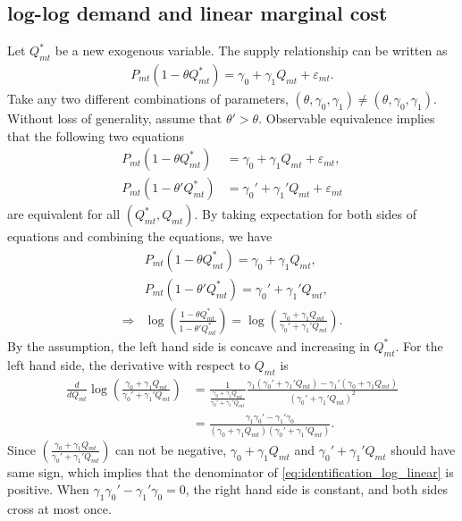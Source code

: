 \documentclass[11pt, a4paper]{article}
\numberwithin{figure}{section}
\theoremstyle{definition}
\newcommand{\0}{\mathbf{0}}
\begin{document}
\subsection{ log-log demand and linear marginal cost}
Let $Q^*_{mt}$ be a new exogenous variable. The supply relationship can be written as 
\begin{align*}
    P_{mt}(1- \theta Q^*_{mt}) = \gamma_0 + \gamma_1 Q_{mt} + \varepsilon_{mt}.
\end{align*}
Take any two different combinations of parameters, $(\theta, \gamma_0, \gamma_1) \ne (\theta, \gamma_0, \gamma_1)$. Without loss of generality, assume that $\theta' > \theta$. Observable equivalence implies that the following two equations
\begin{align*}
    P_{mt}(1- \theta Q^*_{mt}) &= \gamma_0 + \gamma_1 Q_{mt} + \varepsilon_{mt},\\
    P_{mt}(1- \theta' Q^*_{mt}) &= \gamma_0' + \gamma_1' Q_{mt} + \varepsilon_{mt}
\end{align*}
are equivalent for all $(Q^*_{mt}, Q_{mt})$.
By taking expectation for both sides of equations and combining the equations, we have
\begin{align}
    & P_{mt}(1- \theta Q^*_{mt}) = \gamma_0 + \gamma_1 Q_{mt}\nonumber,\\
    & P_{mt}(1- \theta'Q^*_{mt}) = \gamma_0' + \gamma_1' Q_{mt}\nonumber,\\
    \Longrightarrow &\log\left(\frac{1- \theta Q^*_{mt}}{1- \theta' Q^*_{mt}} \right)  = \log\left(\frac{\gamma_0 + \gamma_1 Q_{mt}}{\gamma_0' + \gamma_1' Q_{mt}} \right).
\end{align}
By the assumption, the left hand side is concave and increasing in $Q^*_{mt}$. For the left hand side, the derivative with respect to $Q_{mt}$ is 
\begin{align}
    \frac{d}{d Q_{mt}} \log\left(\frac{\gamma_0 + \gamma_1 Q_{mt}}{\gamma_0' + \gamma_1' Q_{mt}} \right) & = \frac{1}{\frac{\gamma_0 + \gamma_1 Q_{mt}}{\gamma_0' + \gamma_1' Q_{mt}}} \frac{\gamma_1 (\gamma_0' + \gamma_1' Q_{mt}) - \gamma_1' (\gamma_0 + \gamma_1 Q_{mt})}{(\gamma_0' + \gamma_1' Q_{mt})^2}\nonumber\\
    & = \frac{\gamma_1\gamma_0' - \gamma_1' \gamma_0}{(\gamma_0 + \gamma_1 Q_{mt})(\gamma_0' + \gamma_1' Q_{mt})}. \label{eq:identification_log_linear}
\end{align}
Since $\left(\frac{\gamma_0 + \gamma_1 Q_{mt}}{\gamma_0' + \gamma_1' Q_{mt}} \right)$ can not be negative, $\gamma_0 + \gamma_1 Q_{mt}$ and $\gamma_0' + \gamma_1' Q_{mt}$ should have same sign, which implies that the denominator of \eqref{eq:identification_log_linear} is positive. When $\gamma_1\gamma_0' - \gamma_1' \gamma_0=0$, the right hand side is constant, and both sides cross at most once.
\end{document}
